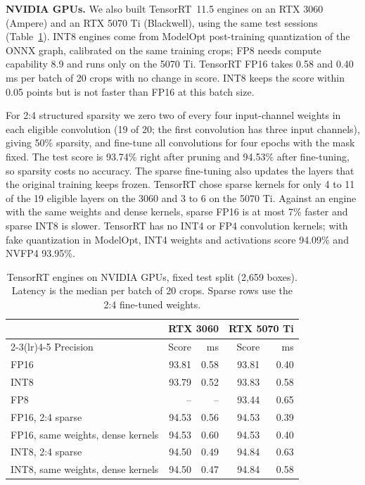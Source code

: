 \documentclass[10pt]{article}
\begin{document}
\textbf{NVIDIA GPUs.} We also built TensorRT~11.5 engines on an RTX 3060 (Ampere) and an RTX 5070 Ti (Blackwell), using the same test sessions (Table~\ref{tab:nvidia}). INT8 engines come from ModelOpt post-training quantization of the ONNX graph, calibrated on the same training crops; FP8 needs compute capability 8.9 and runs only on the 5070 Ti. TensorRT FP16 takes 0.58 and 0.40 ms per batch of 20 crops with no change in score. INT8 keeps the score within 0.05 points but is not faster than FP16 at this batch size.

For 2:4 structured sparsity we zero two of every four input-channel weights in each eligible convolution (19 of 20; the first convolution has three input channels), giving 50\% sparsity, and fine-tune all convolutions for four epochs with the mask fixed. The test score is 93.74\% right after pruning and 94.53\% after fine-tuning, so sparsity costs no accuracy. The sparse fine-tuning also updates the layers that the original training keeps frozen. TensorRT chose sparse kernels for only 4 to 11 of the 19 eligible layers on the 3060 and 3 to 6 on the 5070 Ti. Against an engine with the same weights and dense kernels, sparse FP16 is at most 7\% faster and sparse INT8 is slower. TensorRT has no INT4 or FP4 convolution kernels; with fake quantization in ModelOpt, INT4 weights and activations score 94.09\% and NVFP4 93.95\%.

\begin{table}[tbp]
\centering
\caption{TensorRT engines on NVIDIA GPUs, fixed test split (2,659 boxes). Latency is the median per batch of 20 crops. Sparse rows use the 2:4 fine-tuned weights.}
\label{tab:nvidia}
\small
\begin{tabular}{lrrrr}
\toprule
 & \multicolumn{2}{c}{RTX 3060} & \multicolumn{2}{c}{RTX 5070 Ti} \\
\cmidrule(lr){2-3}\cmidrule(lr){4-5}
Precision & Score & ms & Score & ms \\
\midrule
FP16 & 93.81 & 0.58 & 93.81 & 0.40 \\
INT8 & 93.79 & 0.52 & 93.83 & 0.58 \\
FP8 & -- & -- & 93.44 & 0.65 \\
FP16, 2:4 sparse & 94.53 & 0.56 & 94.53 & 0.39 \\
FP16, same weights, dense kernels & 94.53 & 0.60 & 94.53 & 0.40 \\
INT8, 2:4 sparse & 94.50 & 0.49 & 94.84 & 0.63 \\
INT8, same weights, dense kernels & 94.50 & 0.47 & 94.84 & 0.58 \\
\bottomrule
\end{tabular}
\end{table}
\end{document}
